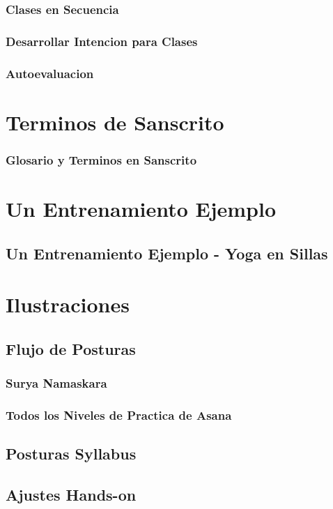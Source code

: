 \documentclass[a4paper]{article}
\begin{document}
\subsubsection{Clases en Secuencia}
\subsubsection{Desarrollar Intencion para Clases}
\subsubsection{Autoevaluacion}

\section{Terminos de Sanscrito}
\subsubsection{Glosario y Terminos en Sanscrito}

\section{Un Entrenamiento Ejemplo}
\subsection{Un Entrenamiento Ejemplo - Yoga en Sillas}

\section{Ilustraciones}
\subsection{Flujo de Posturas}
\subsubsection{Surya Namaskara}
\subsubsection{Todos los Niveles de Practica de Asana}
\subsection{Posturas Syllabus}
\subsection{Ajustes Hands-on}
\end{document}
